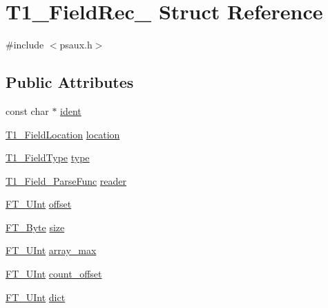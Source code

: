 \hypertarget{struct_t1___field_rec__}{\section{T1\-\_\-\-Field\-Rec\-\_\- Struct Reference}
\label{struct_t1___field_rec__}
}


{\ttfamily \#include $<$psaux.\-h$>$}

\subsection*{Public Attributes}
\begin{DoxyCompactItemize}
\item 
const char $\ast$ \hyperlink{struct_t1___field_rec___aaf70ae870eff9ea2b0518ef5e7301cfd}{ident}
\item 
\hyperlink{psaux_8h_a637c3eacbe10170614859a538510aca8}{T1\-\_\-\-Field\-Location} \hyperlink{struct_t1___field_rec___a1e17111c68df523f82d20bddd822ca4d}{location}
\item 
\hyperlink{psaux_8h_a3f21c4055e4867b15e6ab7210e06ca6f}{T1\-\_\-\-Field\-Type} \hyperlink{struct_t1___field_rec___ad873155b36b72db9a1feaf2699fed1ce}{type}
\item 
\hyperlink{psaux_8h_a3e014419d57759b6e2e6752f04b998fa}{T1\-\_\-\-Field\-\_\-\-Parse\-Func} \hyperlink{struct_t1___field_rec___a95e227de47c22bdadd77f797ff43d89d}{reader}
\item 
\hyperlink{fttypes_8h_abcb8db4dbf35d2b55a9e8c7b0926dc52}{F\-T\-\_\-\-U\-Int} \hyperlink{struct_t1___field_rec___a41b503016f68291e061a2e29498982c1}{offset}
\item 
\hyperlink{fttypes_8h_a51f26183ca0c9f4af958939648caeccd}{F\-T\-\_\-\-Byte} \hyperlink{struct_t1___field_rec___a8ce74a7ad2276abe8942883e7fbb1241}{size}
\item 
\hyperlink{fttypes_8h_abcb8db4dbf35d2b55a9e8c7b0926dc52}{F\-T\-\_\-\-U\-Int} \hyperlink{struct_t1___field_rec___a87f063bd3ad0dcfa30c00946d9f9cae8}{array\-\_\-max}
\item 
\hyperlink{fttypes_8h_abcb8db4dbf35d2b55a9e8c7b0926dc52}{F\-T\-\_\-\-U\-Int} \hyperlink{struct_t1___field_rec___a41d8814cc651d0276f8cfad751721326}{count\-\_\-offset}
\item 
\hyperlink{fttypes_8h_abcb8db4dbf35d2b55a9e8c7b0926dc52}{F\-T\-\_\-\-U\-Int} \hyperlink{struct_t1___field_rec___a509f7ddb1e0ffe050017daa29223e224}{dict}
\end{DoxyCompactItemize}


